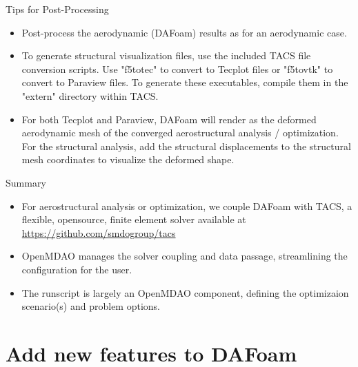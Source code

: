 \documentclass{bredelebeamer}
\begin{document}
\begin{frame}[fragile]{Tips for Post-Processing}
  \begin{itemize}
    \setlength\itemsep{1em}
    \item Post-process the aerodynamic (DAFoam) results as for an aerodynamic case.
    \item To generate structural visualization files, use the included TACS file conversion scripts. Use "f5totec" to convert to Tecplot files or "f5tovtk" to convert to Paraview files. To generate these executables, compile them in the "extern" directory within TACS.
    \item For both Tecplot and Paraview, DAFoam will render as the deformed aerodynamic mesh of the converged aerostructural analysis / optimization. For the structural analysis, add the structural displacements to the structural mesh coordinates to visualize the deformed shape.
  \end{itemize}
\end{frame}

\begin{frame}[fragile]{Summary}
  \begin{itemize}
    \setlength\itemsep{1em}
    \item For aerostructural analysis or optimization, we couple DAFoam with TACS, a flexible, opensource, finite element solver available at \url{https://github.com/smdogroup/tacs}
    \item OpenMDAO manages the solver coupling and data passage, streamlining the configuration for the user.
    \item The runscript is largely an OpenMDAO component, defining the optimizaion scenario(s) and problem options.
  \end{itemize}
\end{frame}


\section{Add new features to DAFoam}
\renewcommand{\arraystretch}{2}
\end{document}
